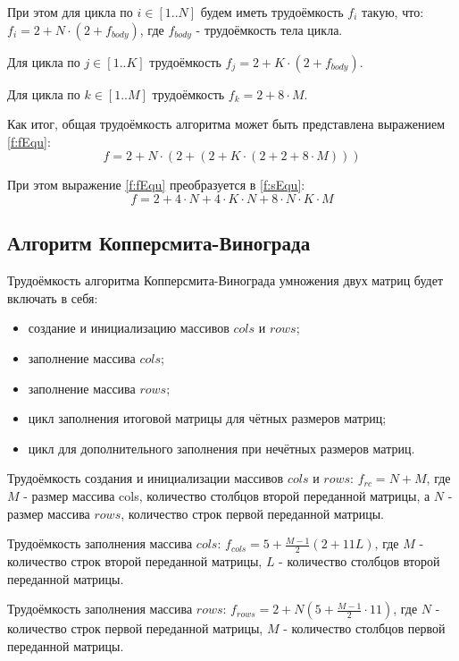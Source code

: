 \documentclass[12pt]{report}
\begin{document}
При этом для цикла по $i \in [1..N]$ будем иметь трудоёмкость $f_{i}$ такую, что: $f_{i} = 2 + N \cdot (2 + f_{body})$, где $f_{body}$ - трудоёмкость тела цикла.

Для цикла по $j \in [1..K]$ трудоёмкость $f_{j} = 2 + K \cdot (2 + f_{body})$.

Для цикла по $k \in [1..M]$ трудоёмкость $f_{k} = 2 + 8 \cdot M$.

Как итог, общая трудоёмкость алгоритма может быть представлена выражением \ref{f:fEqu}:
\begin{equation}
\label{f:fEqu}
f = 2 + N \cdot (2 + (2 + K \cdot(2 + 2 + 8 \cdot M)))
\end{equation}

При этом выражение \ref{f:fEqu} преобразуется в \ref{f:sEqu}:
\begin{equation}
\label{f:sEqu}
f = 2 + 4 \cdot N + 4 \cdot K \cdot N + 8 \cdot N \cdot K \cdot M
\end{equation}

\subsection{Алгоритм Копперсмита-Винограда}
Трудоёмкость алгоритма Копперсмита-Винограда умножения двух матриц будет включать в себя:
\begin{itemize}
\item создание и инициализацию массивов $cols$ и $rows$;
\item заполнение массива $cols$;
\item заполнение массива $rows$;
\item цикл заполнения итоговой матрицы для чётных размеров матриц;
\item цикл для дополнительного заполнения при нечётных размеров матриц.
\end{itemize}

Трудоёмкость создания и инициализации массивов $cols$ и $rows$: $f_{rc} = N + M$, где $M$ - размер массива cols, количество столбцов второй переданной матрицы, а $N$ - размер массива $rows$, количество строк первой переданной матрицы.

Трудоёмкость заполнения массива $cols$: $f_{cols} = 5 + \frac{M - 1}{2}(2 + 11L)$, где $M$ - количество строк второй переданной матрицы, $L$ - количество столбцов второй переданной матрицы.

Трудоёмкость заполнения массива $rows$: $f_{rows} = 2 + N(5 + \frac{M - 1}{2} \cdot 11)$, где $N$ - количество строк первой переданной матрицы, $M$ - количество столбцов первой переданной матрицы.
\end{document}
